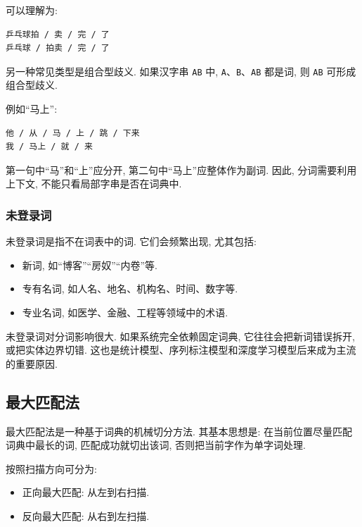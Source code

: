可以理解为:

\begin{Verbatim}[breaklines=true,breakanywhere=true,fontsize=\small]
乒乓球拍 / 卖 / 完 / 了
乒乓球 / 拍卖 / 完 / 了
\end{Verbatim}

另一种常见类型是组合型歧义.
如果汉字串 \texttt{AB} 中, \texttt{A}、\texttt{B}、\texttt{AB} 都是词, 则 \texttt{AB} 可形成组合型歧义.

例如“马上”:

\begin{Verbatim}[breaklines=true,breakanywhere=true,fontsize=\small]
他 / 从 / 马 / 上 / 跳 / 下来
我 / 马上 / 就 / 来
\end{Verbatim}

第一句中“马”和“上”应分开, 第二句中“马上”应整体作为副词.
因此, 分词需要利用上下文, 不能只看局部字串是否在词典中.

\subsubsection{未登录词}


未登录词是指不在词表中的词.
它们会频繁出现, 尤其包括:

\begin{itemize}
\item 新词, 如“博客”“房奴”“内卷”等.
\item 专有名词, 如人名、地名、机构名、时间、数字等.
\item 专业名词, 如医学、金融、工程等领域中的术语.
\end{itemize}

未登录词对分词影响很大.
如果系统完全依赖固定词典, 它往往会把新词错误拆开, 或把实体边界切错.
这也是统计模型、序列标注模型和深度学习模型后来成为主流的重要原因.

\subsection{最大匹配法}


最大匹配法是一种基于词典的机械切分方法.
其基本思想是: 在当前位置尽量匹配词典中最长的词, 匹配成功就切出该词, 否则把当前字作为单字词处理.

按照扫描方向可分为:

\begin{itemize}
\item 正向最大匹配: 从左到右扫描.
\item 反向最大匹配: 从右到左扫描.
\end{itemize}

